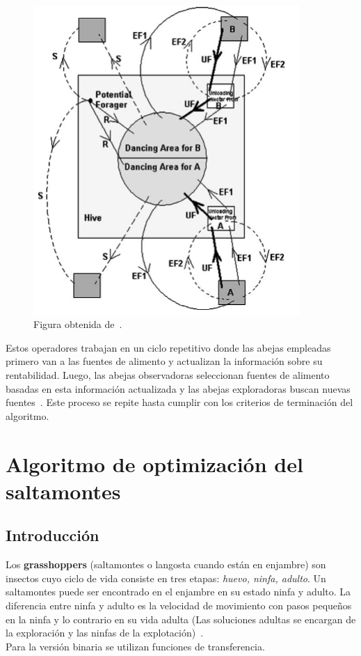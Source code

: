 \begin{figure}[htp]
    \centering
    \includegraphics[width=0.9\textwidth]{imagenes/abco.png}
    \caption[Comportamiento de ABCO]{Figura obtenida de~\cite{Karaboga2009108}.}
\end{figure}

Estos operadores trabajan en un ciclo repetitivo donde las abejas empleadas primero van a las fuentes de alimento y actualizan la información sobre su rentabilidad. Luego, las abejas observadoras seleccionan fuentes de alimento basadas en esta información actualizada y las abejas exploradoras buscan nuevas fuentes~\cite{karaboga_idea_nodate}. Este proceso se repite hasta cumplir con los criterios de terminación del algoritmo.

\section{Algoritmo de optimización del saltamontes}
\subsection{Introducción}
Los \textbf{grasshoppers} (saltamontes o langosta cuando están en enjambre) son insectos cuyo ciclo de vida consiste en tres etapas: \textit{huevo, ninfa, adulto}. Un saltamontes puede ser encontrado en el enjambre en su estado ninfa y adulto. La diferencia entre ninfa y adulto es la velocidad de movimiento con pasos pequeños en la ninfa y lo contrario en su vida adulta (Las soluciones adultas se encargan de la exploración y las ninfas de la explotación)~\cite{saremi_grasshopper_2017}.\\[6pt]
Para la versión binaria se utilizan funciones de transferencia.
